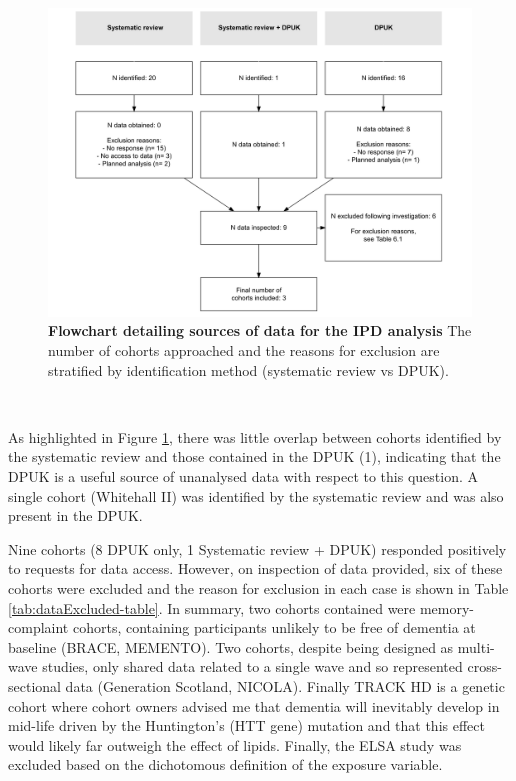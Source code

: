 \documentclass[a4paper, twoside]{templates/ociamthesis}
\begin{document}
\begin{figure}[H]
\includegraphics[width=1\linewidth]{figures/ipd/cohortFlowchart} \caption[Flowchart detailing sources of data for the IPD analysis]{\textbf{Flowchart detailing sources of data for the IPD analysis} The number of cohorts approached and the reasons for exclusion are stratified by identification method (systematic review vs DPUK).}\label{fig:cohortFlowchart}
\end{figure}

~

As highlighted in Figure \ref{fig:cohortFlowchart}, there was little overlap between cohorts identified by the systematic review and those contained in the DPUK (1), indicating that the DPUK is a useful source of unanalysed data with respect to this question. A single cohort (Whitehall II) was identified by the systematic review and was also present in the DPUK.

Nine cohorts (8 DPUK only, 1 Systematic review + DPUK) responded positively to requests for data access. However, on inspection of data provided, six of these cohorts were excluded and the reason for exclusion in each case is shown in Table \ref{tab:dataExcluded-table}. In summary, two cohorts contained were memory-complaint cohorts, containing participants unlikely to be free of dementia at baseline (BRACE, MEMENTO). Two cohorts, despite being designed as multi-wave studies, only shared data related to a single wave and so represented cross-sectional data (Generation Scotland, NICOLA). Finally TRACK HD is a genetic cohort where cohort owners advised me that dementia will inevitably develop in mid-life driven by the Huntington's (HTT gene) mutation and that this effect would likely far outweigh the effect of lipids. Finally, the ELSA study was excluded based on the dichotomous definition of the exposure variable.
\end{document}
